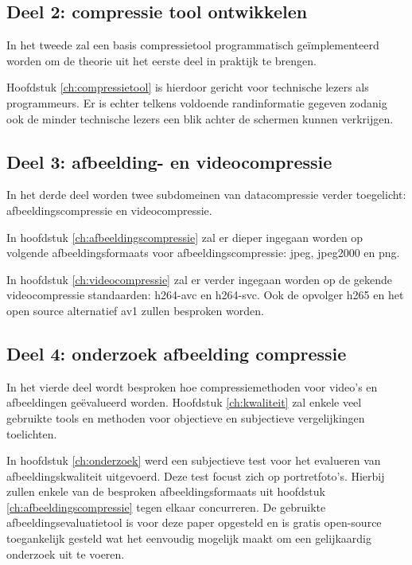 \subsection{Deel 2: compressie tool ontwikkelen}
\label{sec:opzet-bachelorproef-deel-2}
 
 In het tweede zal een basis \gls{compressietool} programmatisch geïmplementeerd worden om de theorie uit het eerste deel in praktijk te brengen.
 
Hoofdstuk \ref{ch:compressietool} is hierdoor gericht voor technische lezers als programmeurs. Er is echter telkens voldoende randinformatie gegeven zodanig ook de minder technische lezers een blik achter de schermen kunnen verkrijgen.

\subsection{Deel 3: afbeelding- en videocompressie}
\label{sec:opzet-bachelorproef-deel-3}

In het derde deel worden twee subdomeinen van \gls{datacompressie} verder toegelicht: \gls{afbeeldingscompressie} en \gls{videocompressie}. 

In hoofdstuk \ref{ch:afbeeldingscompressie} zal er dieper ingegaan worden op volgende \glspl{afbeeldingsformaat} voor \gls{afbeeldingscompressie}: \gls{jpeg}, \gls{jpeg2000} en \gls{png}. 

In hoofdstuk \ref{ch:videocompressie} zal er verder ingegaan worden op de gekende \gls{videocompressie} standaarden: \gls{h264-avc} en \gls{h264-svc}. Ook de opvolger \gls{h265} en het open source alternatief \gls{av1} zullen besproken worden.

\subsection{Deel 4: onderzoek afbeelding compressie}
\label{sec:opzet-bachelorproef-deel-4}

In het vierde deel wordt besproken hoe compressiemethoden voor video's en afbeeldingen geëvalueerd worden. Hoofdstuk \ref{ch:kwaliteit} zal enkele veel gebruikte tools en methoden voor objectieve en subjectieve vergelijkingen toelichten.

In hoofdstuk \ref{ch:onderzoek} werd een subjectieve test voor het evalueren van afbeeldingskwaliteit uitgevoerd. Deze test focust zich op portretfoto's. Hierbij zullen enkele van de besproken \glspl{afbeeldingsformaat} uit hoofdstuk \ref{ch:afbeeldingscompressie} tegen elkaar concurreren. De gebruikte \gls{afbeeldingsevaluatietool} is voor deze paper opgesteld en is gratis \gls{open-source} toegankelijk gesteld wat het eenvoudig mogelijk maakt om een gelijkaardig onderzoek uit te voeren.

